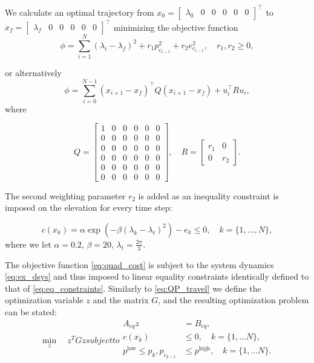 We calculate an optimal trajectory from $x_0 = \begin{bmatrix}\lambda_0&0&0&0&0&0\end{bmatrix}^\top$ to $x_f = \begin{bmatrix}\lambda_f&0&0&0&0&0\end{bmatrix}^\top$ minimizing the objective function 
\begin{equation*}
	\phi = \sum_{i=1}^{N}(\lambda_i - \lambda_f)^2 + r_1 p^2_{c_{i-1}} + r_2 e^2_{c_{i-1}}, \quad r_1,r_2 \ge 0,
\end{equation*}

or alternatively
\begin{equation}
	\label{eq:quad_cost}
	\phi = \sum_{i=0}^{N-1} (x_{i+1}-x_f)^\top Q(x_{i+1}-x_f) + u_i^\top R u_i,
\end{equation}
where

\begin{equation}
Q = \begin{bmatrix}1&0&0&0&0&0\\0&0&0&0&0&0\\0&0&0&0&0&0\\0&0&0&0&0&0\\0&0&0&0&0&0\\0&0&0&0&0&0\end{bmatrix}, \quad R = \begin{bmatrix}r_1&0\\0&r_2\end{bmatrix}.
\end{equation}

 The second weighting parameter $r_2$ is added as an inequality constraint is imposed on the elevation for every time step:

\begin{equation}
	\label{eq:cons}
	c(x_k) = \alpha \exp{\left(-\beta\left(\lambda_k - \lambda_t\right)^2\right)} - e_k \le 0, \quad k = \{1, \dots , N\},
\end{equation}
where we let $\alpha = 0.2$, $\beta = 20$, $\lambda_t = \frac{2\pi}{3}$.

The objective function \eqref{eq:quad_cost} is subject to the system dynamics \eqref{eq:ex_dsys} and thus imposed to linear equality constraints identically defined to that of \eqref{eq:eq_constraints}. Similarly to \eqref{eq:QP_travel} we define the optimization variable $z$ and the matrix $G$, and the resulting optimization problem can be stated:
\begin{subequations}
\label{eq:NOP}
	\begin{equation}
		\min_z \quad z^T G z
	\end{equation}
subject to
\begin{align}
	A_{eq} z &= B_{eq}, \\
	c(x_k) &\le 0, \quad k = \{1, \dots N\},\\
	p^{\textrm{low}} \le p_k,p_{c_{k-1}} &\le p^{\textrm{high}}, \quad k = \{1, \dots N\}.\\
\end{align}
\end{subequations}


